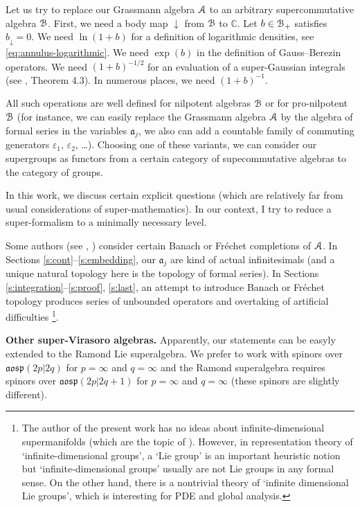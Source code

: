 \documentclass[]{amsart}
\newcounter{sec}
\newcounter{punct}[sec]
\def\punct{\refstepcounter{punct}{\arabic{sec}.\arabic{punct}.  }}
\def\epsilon{\varepsilon}
\def\cA{\EuScript A}
\def\cB{\EuScript B}
\def\fra{\mathfrak a}
\def\C {{\mathbb C }}
\def\sm{\smallskip}
\begin{document}
Let us try to replace our Grassmann algebra $\cA$ to an arbitrary
supercommutative algebra $\cB$. First, we need a body map $\downarrow$
from $\cB$ to $\C$. Let $b\in\cB_+$ satisfies
$b_\downarrow=0$. We need $\ln (1+b)$ for a definition of logarithmic densities,
see \eqref{eq:annulus-logarithmic}. We need $\exp(b)$ in the definition of Gauss--Berezin operators.
We need $(1+b)^{-1/2}$ for an evaluation of a super-Gaussian integrals
(see \cite{Ner-super}, Theorem 4.3). In numerous places, we need $(1+b)^{-1}$.

All such operations are well defined for nilpotent algebras $\cB$ 
or for pro-nilpotent $\cB$ (for instance, we can easily replace
the Grassmann algebra $\cA$ by the algebra of formal series
in the variables $\fra_j$, we also can add a countable 
family of commuting generators $\epsilon_1$, $\epsilon_2$, \dots).  
Choosing one of these variants,
we can consider our supergroups as functors from 
a certain category of supecommutative algebras to the category
of groups.

In this work, we discuss certain explicit questions (which are relatively far
from usual considerations of super-mathematics). In our context,
 I try to reduce a super-formalism to a minimally necessary
 level.


\sm

Some authors (see \cite{VV}, \cite{Mol}) consider certain
Banach or Fr\'echet 
completions of $\cA$. In Sections \ref{s:cont}--\ref{s:embedding},
our $\fra_j$ are kind of actual infinitesimals (and a unique natural topology here
is the topology of formal series). In Sections 
\ref{s:integration}--\ref{s:proof}, \ref{s:last},
an attempt to introduce  Banach or Fr\'echet topology produces series 
of unbounded operators and overtaking of artificial difficulties%
\footnote{The author of the present work has no ideas about infinite-dimensional supermanifolds (which are the topic of \cite{Mol}).
However, in representation theory of  `infinite-dimensional groups',
a `Lie group' is an important heuristic notion but `infinite-dimensional groups' usually are not Lie groups in any formal sense. On the other  hand,
there is a nontrivial theory of `infinite dimensional Lie groups', which
is interesting for PDE and global analysis.}. 

\sm 

{\bf \punct Other super-Virasoro algebras.}
Apparently, our statements can be easyly extended to
the Ramond Lie superalgebra. We prefer to work with spinors over
$\mathfrak{aosp}(2p|2q)$ for $p=\infty$ and $q=\infty$ and the Ramond superalgebra
requires spinors over $\mathfrak{aosp}(2p|2q+1)$ for $p=\infty$ and $q=\infty$
(these spinors are slightly different).
\end{document}
